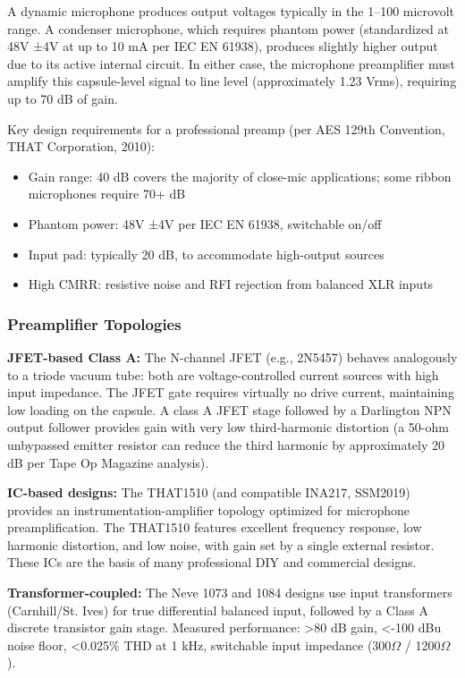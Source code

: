 \documentclass[11pt,letterpaper]{article}
\begin{document}
A dynamic microphone produces output voltages typically in the 1--100 microvolt range. A condenser microphone, which requires phantom power (standardized at 48V ±4V at up to 10 mA per IEC EN 61938), produces slightly higher output due to its active internal circuit. In either case, the microphone preamplifier must amplify this capsule-level signal to line level (approximately 1.23 Vrms), requiring up to 70 dB of gain.

Key design requirements for a professional preamp (per AES 129th Convention, THAT Corporation, 2010):
\begin{itemize}
  \item Gain range: 40 dB covers the majority of close-mic applications; some ribbon microphones require 70+ dB
  \item Phantom power: 48V ±4V per IEC EN 61938, switchable on/off
  \item Input pad: typically 20 dB, to accommodate high-output sources
  \item High CMRR: resistive noise and RFI rejection from balanced XLR inputs
\end{itemize}

\subsubsection{Preamplifier Topologies}

\textbf{JFET-based Class A:} The N-channel JFET (e.g., 2N5457) behaves analogously to a triode vacuum tube: both are voltage-controlled current sources with high input impedance. The JFET gate requires virtually no drive current, maintaining low loading on the capsule. A class A JFET stage followed by a Darlington NPN output follower provides gain with very low third-harmonic distortion (a 50-ohm unbypassed emitter resistor can reduce the third harmonic by approximately 20 dB per Tape Op Magazine analysis).

\textbf{IC-based designs:} The THAT1510 (and compatible INA217, SSM2019) provides an instrumentation-amplifier topology optimized for microphone preamplification. The THAT1510 features excellent frequency response, low harmonic distortion, and low noise, with gain set by a single external resistor. These ICs are the basis of many professional DIY and commercial designs.

\textbf{Transformer-coupled:} The Neve 1073 and 1084 designs use input transformers (Carnhill/St. Ives) for true differential balanced input, followed by a Class A discrete transistor gain stage. Measured performance: >80 dB gain, <-100 dBu noise floor, <0.025\% THD at 1 kHz, switchable input impedance (300$\Omega$ / 1200$\Omega$).
\end{document}
